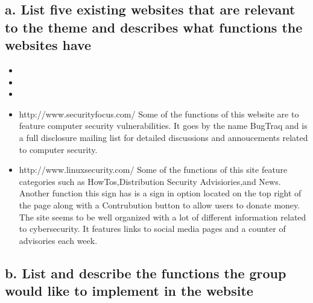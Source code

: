 \documentclass{article}
\begin{document}
\subsection{a. List five existing websites that are relevant to the theme and describes what functions the websites have}
\begin{itemize}
    \item %
    
    \item %
    
    \item %
    
    \item %
    http://www.securityfocus.com/ 
    Some of the functions of this website are to feature computer security vulnerabilities. It goes by the name BugTraq and is a full disclosure mailing list
    for detailed discussions and annoucements related to computer security.
    \item %
    http://www.linuxsecurity.com/
    Some of the functions of this site feature categories such as HowTos,Distribution Security Advisiories,and News.
         Another function this sign has is a sign in option located on the top right of the page along with a Contrubution button to allow users to donate money.
         The site seems to be well organized with a lot of different information related to cybersecurity. 
         It features links to social media pages and a counter of advisories each week.
\end{itemize}



\subsection{b. List and describe the functions the group would like to implement in the website}
\end{document}
